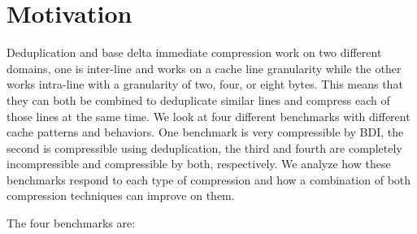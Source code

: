 \section{Motivation}
\label{sec:Motivation}
Deduplication and base delta immediate compression work on two different domains, one is inter-line and works on a cache line granularity while the other works intra-line with a granularity of two, four, or eight bytes. This means that they can both be combined to deduplicate similar lines and compress each of those lines at the same time.
We look at four different benchmarks with different cache patterns and behaviors. One benchmark is very compressible by BDI, the second is compressible using deduplication, the third and fourth are completely incompressible and compressible by both, respectively. We analyze how these benchmarks respond to each type of compression and how a combination of both compression techniques can improve on them.\par
The four benchmarks are:
